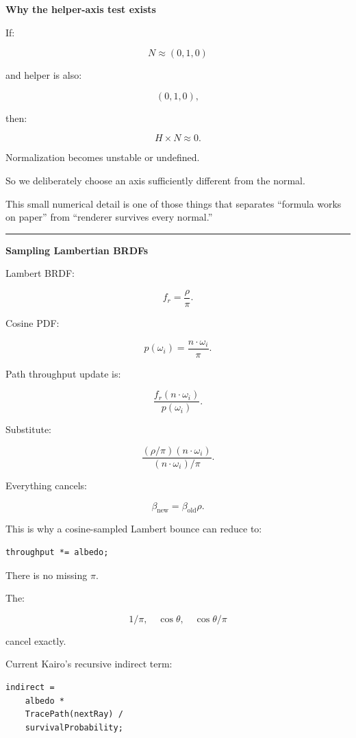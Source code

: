 \textbf{Why the helper-axis test exists}

If:

\[
N\approx(0,1,0)
\]

and helper is also:

\[
(0,1,0),
\]

then:

\[
H\times N\approx0.
\]

Normalization becomes unstable or undefined.

So we deliberately choose an axis sufficiently different from the normal.

This small numerical detail is one of those things that separates ``formula works on paper'' from ``renderer survives every normal.''

\begin{center}\rule{0.5\linewidth}{0.5pt}\end{center}

\textbf{Sampling Lambertian BRDFs}

Lambert BRDF:

\[
f_r=\frac{\rho}{\pi}.
\]

Cosine PDF:

\[
p(\omega_i)
=
\frac{n\cdot\omega_i}{\pi}.
\]

Path throughput update is:

\[
\frac{
f_r
(n\cdot\omega_i)
}{
p(\omega_i)
}.
\]

Substitute:

\[
\frac{
(\rho/\pi)
(n\cdot\omega_i)
}{
(n\cdot\omega_i)/\pi
}.
\]

Everything cancels:

\[
\boxed{
\beta_{\text{new}}
=
\beta_{\text{old}}\rho.
}
\]

This is why a cosine-sampled Lambert bounce can reduce to:

\begin{verbatim}
throughput *= albedo;
\end{verbatim}

There is no missing \(\pi\).

The:

\[
1/\pi,
\quad
\cos\theta,
\quad
\cos\theta/\pi
\]

cancel exactly.

Current Kairo's recursive indirect term:

\begin{verbatim}
indirect =
    albedo *
    TracePath(nextRay) /
    survivalProbability;
\end{verbatim}

